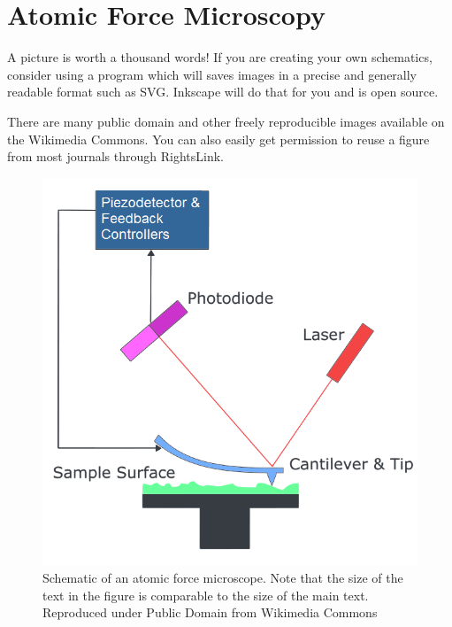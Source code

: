 \section{Atomic Force Microscopy}

A picture is worth a thousand words!  If you are creating your own schematics, consider using a program which will saves images in a precise and generally readable format such as SVG.  Inkscape will do that for you and is open source.

There are many public domain and other freely reproducible images available on the Wikimedia Commons.  You can also easily get permission to reuse a figure from most journals through RightsLink.

\begin{figure}[!hbtp]
\centering
    \includegraphics[totalheight=0.5\textwidth, natwidth=640,natheight=640]{640px-Atomic_force_microscope_block_diagram.png}
\caption{Schematic of an atomic force microscope. Note that the size of the text in the figure is comparable to the size of the main text.  Reproduced under Public Domain from Wikimedia Commons\label{AFMblock}}
\end{figure} 


